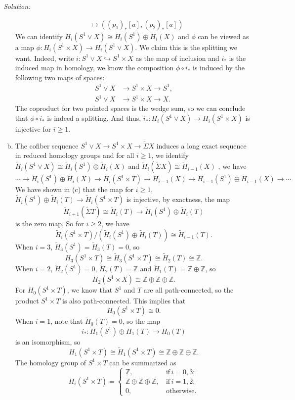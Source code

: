 \documentclass[a4paper, 12pt]{article}
\newenvironment{solution}
    {\textit{Solution:}}
    {}
\begin{document}
\begin{solution}
\begin{enumerate}[(a)]
\begin{align*}
         [a]&\mapsto ((p_1)_*[a],(p_2)_*[a])
\end{align*}
We can identify \(H_i(S^1\vee X)\cong H_i(S^1)\oplus H_i(X)\) and \(\phi\) can be viewed as a map \(\phi:H_i(S^1\times X)\rightarrow H_i(S^1\vee X)\). We claim this is the splitting we want. Indeed, 
write \(i:S^1\vee X\hookrightarrow S^1\times X\) as the map of inclusion and \(i_*\) is the induced map in homology, we know the composition \(\phi\circ i_*\) is induced by the following two maps of spaces:
\begin{align*}
S^1\vee X&\rightarrow S^1\times X\rightarrow S^1,\\ 
S^1\vee X&\rightarrow S^1\times X\rightarrow X.
\end{align*} 
The coproduct for two pointed spaces is the wedge sum, so we can conclude that \(\phi\circ i_*\) is indeed a splitting. And thus, \(i_*:H_i(S^1\vee X)\rightarrow H_i(S^1\times X)\) is injective for \(i\geq 1\). 
\item The cofiber sequence \(S^1\vee X\rightarrow S^1\times X\rightarrow \tilde{\Sigma}X\) induces a long exact sequence in reduced homology groups and for all \(i\geq 1\), we identify \(\tilde{H}_i(S^1\vee X)\cong \tilde{H}_i(S^1)\oplus \tilde{H}_i(X)\) 
and \(\tilde{H}_i(\tilde{\Sigma}X)\cong \tilde{H}_{i-1}(X)\) , we have 
\[\cdots\rightarrow \tilde{H}_i(S^1)\oplus \tilde{H}_i(X)\rightarrow \tilde{H}_i(S^1\times T)\rightarrow \tilde{H}_{i-1}(X)\rightarrow \tilde{H}_{i-1}(S^1)\oplus \tilde{H}_{i-1}(X)\rightarrow \cdots\]
We have shown in (c) that the map for \(i\geq 1\), \(\tilde{H}_i(S^1)\oplus \tilde{H}_i(T)\rightarrow \tilde{H}_i(S^1\times T)\) is injective, by exactness, the map 
\[\tilde{H}_{i+1}(\tilde{\Sigma}T)\cong \tilde{H}_i(T)\rightarrow \tilde{H}_i(S^1)\oplus \tilde{H}_i(T)\]
is the zero map. So for \(i\geq 2\), we have 
\[\tilde{H}_{i}(S^1\times T)/(\tilde{H}_{i}(S^1)\oplus \tilde{H}_{i}(T))\cong \tilde{H}_{i-1}(T).\]
When \(i=3\), \(\tilde{H}_3(S^1)=\tilde{H}_3(T)=0\), so 
\[H_3(S^1\times T)\cong \tilde{H}_3(S^1\times T)\cong \tilde{H}_2(T)\cong \mathbb{Z}.\]
When \(i=2\), \(\tilde{H}_2(S^1)=0\), \(\tilde{H}_2(T)=\mathbb{Z}\) and \(\tilde{H}_1(T)=\mathbb{Z}\oplus \mathbb{Z}\), so 
\[H_2(S^1\times X)\cong \mathbb{Z}\oplus \mathbb{Z}\oplus \mathbb{Z}.\]
For \(H_0(S^1\times T)\), we know that \(S^1\) and \(T\) are all path-connected, so the product \(S^1\times T\) is also path-connected. This implies that 
\[H_0(S^1\times T)\cong 0.\]
When \(i=1\), note that \(\tilde{H}_0(T)=0\), so the map 
\[i_*:\tilde{H}_1(S^1)\oplus \tilde{H}_1(T)\rightarrow \tilde{H}_0(T)\]
is an isomorphism, so 
\[H_1(S^1\times T)\cong \tilde{H}_1(S^1\times T)\cong \mathbb{Z}\oplus \mathbb{Z}\oplus \mathbb{Z}.\]
The homology group of \(S^1\times T\) can be summarized as 
\[H_i(S^1\times T)=\begin{cases}
    \mathbb{Z},&\, \text{if}\, i=0,3;\\ 
    \mathbb{Z}\oplus \mathbb{Z}\oplus \mathbb{Z},&\, \text{if}\, i=1,2;\\
    0,&\, \text{otherwise}.
\end{cases}\]


\end{enumerate}
\end{solution}
\end{document}
